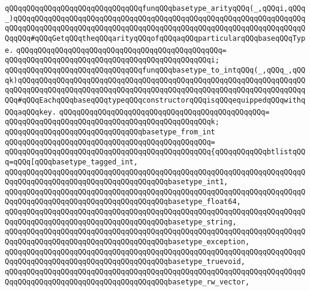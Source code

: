 \verb|qQQqqQQqqQQqqQQqqQQqqQQqqQQqqQQqfunqQQqbasetype_arityqQQq(_,qQQqi,qQQq_)qQQqqQQqqQQqqQQqqQQqqQQqqQQqqQQqqQQqqQQqqQQqqQQqqQQqqQQqqQQqqQQqqQQqqQQqqQQqqQQqqQQqqQQqqQQqqQQqqQQqqQQqqQQqqQQqqQQqqQQqqQQqqQQqqQQqqQQqqQQqqQQq#qQQqGetqQQqtheqQQqarityqQQqofqQQqaqQQqparticularqQQqbaseqQQqType.|\newline
\verb|qQQqqQQqqQQqqQQqqQQqqQQqqQQqqQQqqQQqqQQqqQQqqQQq=|\newline
\verb|qQQqqQQqqQQqqQQqqQQqqQQqqQQqqQQqqQQqqQQqqQQqqQQqi;|\newline
\newline
\newline
\verb|qQQqqQQqqQQqqQQqqQQqqQQqqQQqqQQqfunqQQqbasetype_to_intqQQq(_,qQQq_,qQQqk)qQQqqQQqqQQqqQQqqQQqqQQqqQQqqQQqqQQqqQQqqQQqqQQqqQQqqQQqqQQqqQQqqQQqqQQqqQQqqQQqqQQqqQQqqQQqqQQqqQQqqQQqqQQqqQQqqQQqqQQqqQQqqQQqqQQqqQQqqQQq#qQQqEachqQQqbaseqQQqtypeqQQqconstructorqQQqisqQQqequippedqQQqwithqQQqaqQQqkey.|\newline
\verb|qQQqqQQqqQQqqQQqqQQqqQQqqQQqqQQqqQQqqQQqqQQqqQQq=|\newline
\verb|qQQqqQQqqQQqqQQqqQQqqQQqqQQqqQQqqQQqqQQqqQQqqQQqk;|\newline
\newline
\newline
\verb|qQQqqQQqqQQqqQQqqQQqqQQqqQQqqQQqbasetype_from_int|\newline
\verb|qQQqqQQqqQQqqQQqqQQqqQQqqQQqqQQqqQQqqQQqqQQqqQQq=|\newline
\verb|qQQqqQQqqQQqqQQqqQQqqQQqqQQqqQQqqQQqqQQqqQQqqQQq{qQQqqQQqqQQqbtlistqQQq=qQQq[qQQqbasetype_tagged_int,|\newline
\verb|qQQqqQQqqQQqqQQqqQQqqQQqqQQqqQQqqQQqqQQqqQQqqQQqqQQqqQQqqQQqqQQqqQQqqQQqqQQqqQQqqQQqqQQqqQQqqQQqqQQqqQQqqQQqbasetype_int1,|\newline
\verb|qQQqqQQqqQQqqQQqqQQqqQQqqQQqqQQqqQQqqQQqqQQqqQQqqQQqqQQqqQQqqQQqqQQqqQQqqQQqqQQqqQQqqQQqqQQqqQQqqQQqqQQqqQQqbasetype_float64,|\newline
\verb|qQQqqQQqqQQqqQQqqQQqqQQqqQQqqQQqqQQqqQQqqQQqqQQqqQQqqQQqqQQqqQQqqQQqqQQqqQQqqQQqqQQqqQQqqQQqqQQqqQQqqQQqqQQqbasetype_string,|\newline
\verb|qQQqqQQqqQQqqQQqqQQqqQQqqQQqqQQqqQQqqQQqqQQqqQQqqQQqqQQqqQQqqQQqqQQqqQQqqQQqqQQqqQQqqQQqqQQqqQQqqQQqqQQqqQQqbasetype_exception,|\newline
\verb|qQQqqQQqqQQqqQQqqQQqqQQqqQQqqQQqqQQqqQQqqQQqqQQqqQQqqQQqqQQqqQQqqQQqqQQqqQQqqQQqqQQqqQQqqQQqqQQqqQQqqQQqqQQqbasetype_truevoid,|\newline
\verb|qQQqqQQqqQQqqQQqqQQqqQQqqQQqqQQqqQQqqQQqqQQqqQQqqQQqqQQqqQQqqQQqqQQqqQQqqQQqqQQqqQQqqQQqqQQqqQQqqQQqqQQqqQQqbasetype_rw_vector,|\newline
